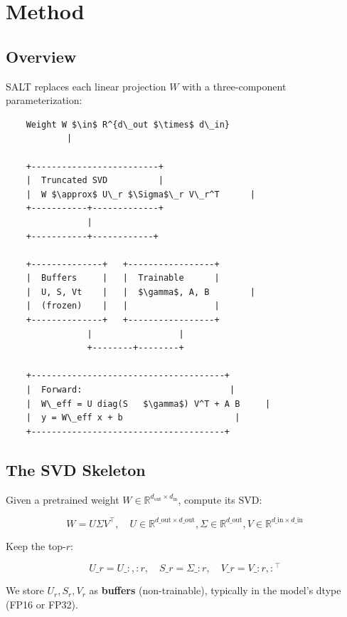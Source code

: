 
\section{Method}

\subsection{Overview}

SALT replaces each linear projection $W$ with a three-component parameterization:

\begin{lstlisting}
    Weight W $\in$ R^{d\_out $\times$ d\_in}
            |
             
    +-------------------------+
    |  Truncated SVD          |
    |  W $\approx$ U\_r $\Sigma$\_r V\_r^T      |
    +-----------+-------------+
                |
    +-----------+------------+
                              
    +--------------+   +-----------------+
    |  Buffers     |   |  Trainable      |
    |  U, S, Vt    |   |  $\gamma$, A, B        |
    |  (frozen)    |   |                 |
    +--------------+   +-----------------+
                |                 |
                +--------+--------+
                          
    +--------------------------------------+
    |  Forward:                             |
    |  W\_eff = U diag(S   $\gamma$) V^T + A B     |
    |  y = W\_eff x + b                      |
    +--------------------------------------+
\end{lstlisting}

\subsection{The SVD Skeleton}

Given a pretrained weight $W \in \mathbb{R}^{d_\text{out} \times d_\text{in}}$, 
compute its SVD:

\[
W = U \Sigma V^\top, \quad U \in \mathbb{R}^{d\_\text{out} \times d\_\text{out}}, 
\Sigma \in \mathbb{R}^{d\_\text{out}}, V \in \mathbb{R}^{d\_\text{in} \times d\_\text{in}}
\tag{4.1}
\]

Keep the top-$r$:

\[
U\_r = U\_{:, :r}, \quad S\_r = \Sigma\_{:r}, \quad V\_r = V\_{:r, :}^\top
\tag{4.2}
\]

We store $U_r, S_r, V_r$ as \textbf{buffers} (non-trainable), typically in the 
model's dtype (FP16 or FP32).

